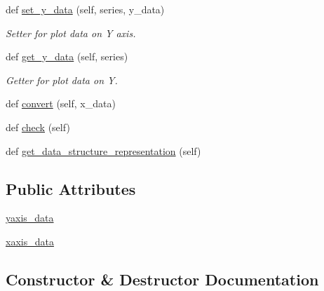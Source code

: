 \begin{DoxyCompactItemize}
def \mbox{\hyperlink{classbridges_1_1line__chart_1_1_line_chart_ae5988ed81be128f96d63526560c61d9f}{set\+\_\+y\+\_\+data}} (self, series, y\+\_\+data)
\begin{DoxyCompactList}\small\item\em Setter for plot data on Y axis. \end{DoxyCompactList}\item 
def \mbox{\hyperlink{classbridges_1_1line__chart_1_1_line_chart_ad598554c70b1524eb900b4a66635e367}{get\+\_\+y\+\_\+data}} (self, series)
\begin{DoxyCompactList}\small\item\em Getter for plot data on Y. \end{DoxyCompactList}\item 
def \mbox{\hyperlink{classbridges_1_1line__chart_1_1_line_chart_ab9d76afae32e71d0a640ac26b13e645c}{convert}} (self, x\+\_\+data)
\item 
def \mbox{\hyperlink{classbridges_1_1line__chart_1_1_line_chart_a4d331f4d5906f70b09efd11728d703a7}{check}} (self)
\item 
def \mbox{\hyperlink{classbridges_1_1line__chart_1_1_line_chart_a51cb18ae6ebe1fa514de14b8006cc238}{get\+\_\+data\+\_\+structure\+\_\+representation}} (self)
\end{DoxyCompactItemize}
\subsection*{Public Attributes}
\begin{DoxyCompactItemize}
\item 
\mbox{\hyperlink{classbridges_1_1line__chart_1_1_line_chart_ae32afdcdfe6398ef247f9431de603495}{yaxis\+\_\+data}}
\item 
\mbox{\hyperlink{classbridges_1_1line__chart_1_1_line_chart_a13a52ecfbe82477fd6203aaa7569c1c7}{xaxis\+\_\+data}}
\end{DoxyCompactItemize}


\subsection{Constructor \& Destructor Documentation}
\mbox{\label{classbridges_1_1line__chart_1_1_line_chart_a20c96d892b92624aa367710c9b4386fa}} 
